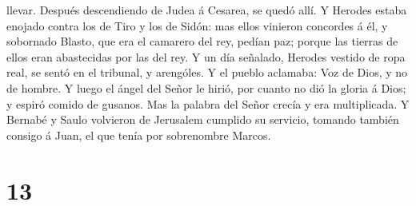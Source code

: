 llevar. Después descendiendo de Judea á Cesarea, se quedó allí.
 Y Herodes estaba enojado contra los de Tiro y los de
Sidón: mas ellos vinieron concordes á él, y sobornado Blasto, que era el
camarero del rey, pedían paz; porque las tierras de ellos eran
abastecidas por las del rey.  Y un día señalado, Herodes
vestido de ropa real, se sentó en el tribunal, y arengóles.
 Y el pueblo aclamaba: Voz de Dios, y no de hombre.
 Y luego el ángel del Señor le hirió, por cuanto no dió la
gloria á Dios; y espiró comido de gusanos.  Mas la palabra
del Señor crecía y era multiplicada.  Y Bernabé y Saulo
volvieron de Jerusalem cumplido su servicio, tomando también consigo á
Juan, el que tenía por sobrenombre Marcos.

\hypertarget{section-12}{%
\section{13}\label{section-12}}

